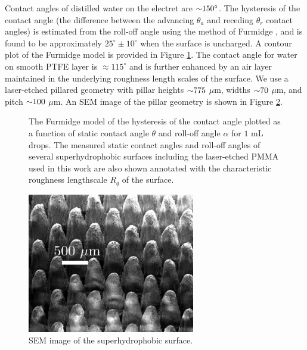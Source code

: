 \documentclass[12pt,a4paper,oneside]{book}
\begin{document}
Contact angles of distilled water on the electret are $\sim \hspace{-1mm} 150^{\circ}$. The hysteresis of the contact angle (the difference between the advancing $\theta_a$ and receding $\theta_r$ contact angles) is estimated from the roll-off angle using the method of Furmidge \cite{furmidge_studies_1962}, and is found to be approximately $25^{\circ} \pm 10^{\circ}$ when the surface is uncharged. A contour plot of the Furmidge model is provided in Figure \ref{fig:hysteresis}. The contact angle for water on smooth PTFE layer is $\approx 115^{\circ}$ and is further enhanced by an air layer maintained in the underlying roughness length scales of the surface. We use a laser-etched pillared geometry with pillar heights $\sim \hspace{-1mm} 775$ $\mu$m, widths $\sim \hspace{-1mm} 70$ $\mu$m, and pitch $\sim \hspace{-1mm} 100$ $\mu$m. An SEM image of the pillar geometry is shown in Figure \ref{fig:SEM}.
\begin{figure}
    \centering
    
       \caption{The Furmidge model of the hysteresis of the contact angle plotted as a function of static contact angle $\theta$ and roll-off angle $\alpha$ for $1$ mL drops. The measured static contact angles and roll-off angles of several superhydrophobic surfaces including the laser-etched PMMA used in this work are also shown annotated with the characteristic roughness lengthscale $R_q$ of the surface.\label{fig:hysteresis}}
\end{figure}

\begin{figure}
 \centering
 \includegraphics[width=0.65\textwidth]{../figures/SEM.pdf}
 \caption{SEM image of the superhydrophobic surface.\label{fig:SEM}}
\end{figure}
\end{document}
